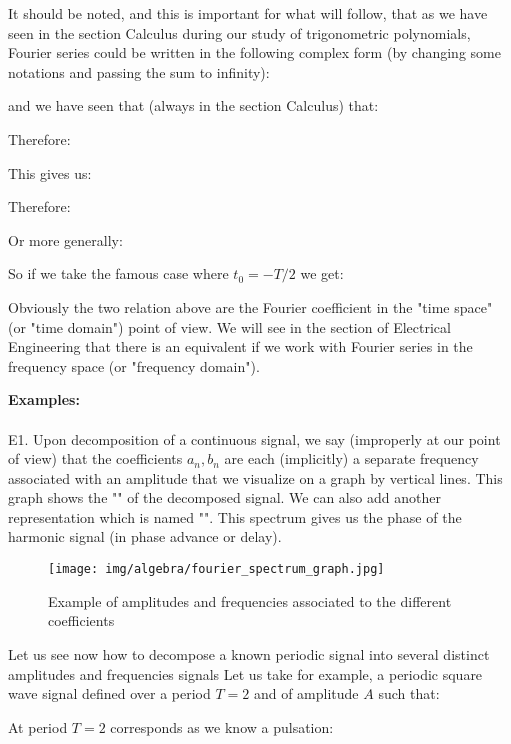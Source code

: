 	It should be noted, and this is important for what will follow, that as we have seen in the section Calculus during our study of trigonometric polynomials, Fourier series could be written in the following complex form (by changing some notations and passing the sum to infinity):
	
	and we have seen that (always in the section Calculus) that:
	
	Therefore:
	
	This gives us:
	
	Therefore:
	
	Or more generally:
	
	So if we take the famous case where $t_0=-T/2$ we get:
	
	Obviously the two relation above are the Fourier coefficient in the "time space" (or "time domain") point of view. We will see in the section of Electrical Engineering that there is an equivalent if we work with Fourier series in the frequency space (or "frequency domain").
	
	\begin{tcolorbox}[colframe=black,colback=white,sharp corners]
	\textbf{{\Large {}}Examples:}\\\\
	E1. Upon decomposition of a continuous signal, we say (improperly at our point of view) that the coefficients $a_n,b_n$ are each (implicitly) a separate frequency associated with an amplitude that we visualize on a graph by vertical lines. This graph shows the "" of the decomposed signal. We can also add another representation which is named "". This spectrum gives us the phase of the harmonic signal (in phase advance or delay).
	\begin{figure}[H]
		\centering
		\texttt{[image: img/algebra/fourier\_spectrum\_graph.jpg]}
		\caption{Example of amplitudes and frequencies associated to the different coefficients}
	\end{figure}
	Let us see now how to decompose a known periodic signal into several distinct amplitudes and frequencies signals
	Let us take for example, a periodic square wave signal defined over a period $T = 2$ and of amplitude $A$ such that:
	
	At period $T = 2$ corresponds as we know a pulsation:
	
	\end{tcolorbox}
	
